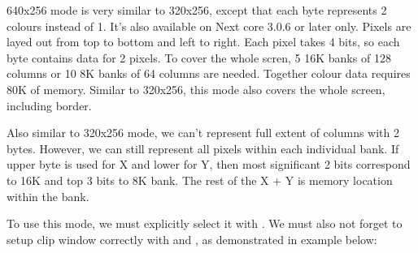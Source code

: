 \documentclass[12pt,twoside,openright,a4paper]{book}
\begin{document}
640x256 mode is very similar to 320x256, except that each byte represents 2 colours instead of 1. It's also available on Next core 3.0.6 or later only. Pixels are layed out from top to bottom and left to right. Each pixel takes 4 bits, so each byte contains data for 2 pixels. To cover the whole scren, 5 16K banks of 128 columns or 10 8K banks of 64 columns are needed. Together colour data requires 80K of memory. Similar to 320x256, this mode also covers the whole screen, including border.

Also similar to 320x256 mode, we can't represent full extent of columns with 2 bytes. However, we can still represent all pixels within each individual bank. If upper byte is used for X and lower for Y, then most significant 2 bits correspond to 16K and top 3 bits to 8K bank. The rest of the X + Y is memory location within the bank.

To use this mode, we must explicitly select it with . We must also not forget to setup clip window correctly with  and , as demonstrated in example below:
\end{document}
